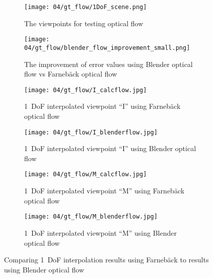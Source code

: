 \begin{figure}
\centering
    \hfill
    \begin{subfigure}[b]{0.4\textwidth}
            \centering
            \texttt{[image: 04/gt\_flow/1DoF\_scene.png]}
            \caption{The viewpoints for testing optical flow}
    \end{subfigure}
    \hfill
    \begin{subfigure}[b]{0.4\textwidth}
            \centering
            \texttt{[image: 04/gt\_flow/blender\_flow\_improvement\_small.png]}
            \caption{The improvement of error values using Blender optical flow vs Farneb\"ack optical flow}
    \end{subfigure}
    \hfill
    \hfill
\par\bigskip
    \hfill
    \begin{subfigure}[b]{0.4\textwidth}
            \centering
            \texttt{[image: 04/gt\_flow/I\_calcflow.jpg]}
            \caption{1~DoF interpolated viewpoint ``I'' using Farneb\"ack optical flow}
    \end{subfigure}
    \hfill
    \begin{subfigure}[b]{0.4\textwidth}
            \centering
            \texttt{[image: 04/gt\_flow/I\_blenderflow.jpg]}
            \caption{1~DoF interpolated viewpoint ``I'' using Blender optical flow}
    \end{subfigure}
    \hfill
    \hfill
\par\bigskip
    \hfill
    \begin{subfigure}[b]{0.4\textwidth}
            \centering
            \texttt{[image: 04/gt\_flow/M\_calcflow.jpg]}
            \caption{1~DoF interpolated viewpoint ``M'' using Farneb\"ack optical flow}
    \end{subfigure}
    \hfill
    \begin{subfigure}[b]{0.4\textwidth}
            \centering
            \texttt{[image: 04/gt\_flow/M\_blenderflow.jpg]}
            \caption{1~DoF interpolated viewpoint ``M'' using Blender optical flow}
    \end{subfigure}
    \hfill
    \hfill
  \caption{Comparing 1~DoF interpolation results using Farneb\"ack to results using Blender optical flow} \label{fig:of_comparison}
\end{figure}



